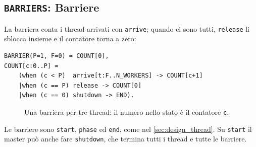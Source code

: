 \subsection{\texttt{BARRIERS}: Barriere}
La barriera conta i thread arrivati con \texttt{arrive}; quando ci sono tutti, \texttt{release} li sblocca insieme e il contatore torna a zero:
\begin{lstlisting}[style=fsp]
BARRIER(P=1, F=0) = COUNT[0],
COUNT[c:0..P] =
    (when (c < P)  arrive[t:F..N_WORKERS] -> COUNT[c+1]
    |when (c == P) release -> COUNT[0]
    |when (c == 0) shutdown -> END).
\end{lstlisting}

\begin{figure}[H]
  \centering
  \caption{Una barriera per tre thread: il numero nello stato è il contatore \texttt{c}.}
  \label{fig:barriera}
\end{figure}

Le barriere sono \texttt{start}, \texttt{phase} ed \texttt{end}, come nel \cref{sec:design_thread}.
Su \texttt{start} il master può anche fare \texttt{shutdown}, che termina tutti i thread e tutte le barriere.

